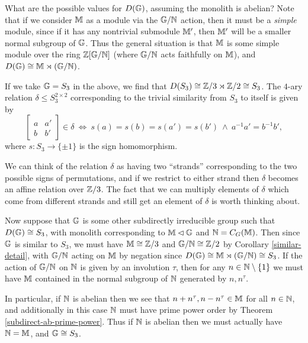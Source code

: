 \begin{appendices}
\begin{ex}
What are the possible values for $D(\mathbb{G})$, assuming the monolith is abelian? Note that if we consider $\mathbb{M}$ as a module via the $\mathbb{G}/\mathbb{N}$ action, then it must be a \emph{simple} module, since if it has any nontrivial submodule $\mathbb{M}'$, then $\mathbb{M}'$ will be a smaller normal subgroup of $\mathbb{G}$. Thus the general situation is that $\mathbb{M}$ is some simple module over the ring $\mathbb{Z}[\mathbb{G}/\mathbb{N}]$ (where $\mathbb{G}/\mathbb{N}$ acts faithfully on $\mathbb{M}$), and $D(\mathbb{G}) \cong \mathbb{M} \rtimes (\mathbb{G}/\mathbb{N})$.
\end{ex}

\begin{ex} If we take $\mathbb{G} = S_3$ in the above, we find that $D(S_3) \cong \mathbb{Z}/3 \rtimes \mathbb{Z}/2 \cong S_3$. The $4$-ary relation $\delta \le S_3^{2\times 2}$ corresponding to the trivial similarity from $S_3$ to itself is given by
\[
\begin{bmatrix} a & a'\\ b & b'\end{bmatrix} \in \delta\ \iff\ s(a) = s(b) = s(a') = s(b')\ \wedge\ a^{-1}a' = b^{-1}b',
\]
where $s : S_3 \rightarrow \{\pm 1\}$ is the sign homomorphism.

We can think of the relation $\delta$ as having two ``strands'' corresponding to the two possible signs of permutations, and if we restrict to either strand then $\delta$ becomes an affine relation over $\mathbb{Z}/3$. The fact that we can multiply elements of $\delta$ which come from different strands and still get an element of $\delta$ is worth thinking about.

Now suppose that $\mathbb{G}$ is some other subdirectly irreducible group such that $D(\mathbb{G}) \cong S_3$, with monolith corresponding to $\mathbb{M} \lhd \mathbb{G}$ and $\mathbb{N} = C_G(\mathbb{M})$. Then since $\mathbb{G}$ is similar to $S_3$, we must have $\mathbb{M} \cong \mathbb{Z}/3$ and $\mathbb{G}/\mathbb{N} \cong \mathbb{Z}/2$ by Corollary \ref{similar-detail}, with $\mathbb{G}/\mathbb{N}$ acting on $\mathbb{M}$ by negation since $D(\mathbb{G}) \cong \mathbb{M} \rtimes (\mathbb{G}/\mathbb{N}) \cong S_3$. If the action of $\mathbb{G}/\mathbb{N}$ on $\mathbb{N}$ is given by an involution $\tau$, then for any $n \in \mathbb{N} \setminus \{1\}$ we must have $\mathbb{M}$ contained in the normal subgroup of $\mathbb{N}$ generated by $n, n^\tau$.

In particular, if $\mathbb{N}$ is abelian then we see that $n + n^\tau, n - n^\tau \in \mathbb{M}$ for all $n \in \mathbb{N}$, and additionally in this case $\mathbb{N}$ must have prime power order by Theorem \ref{subdirect-ab-prime-power}. Thus if $\mathbb{N}$ is abelian then we must actually have $\mathbb{N} = \mathbb{M}$, and $\mathbb{G} \cong S_3$.
\end{ex}


\end{appendices}
